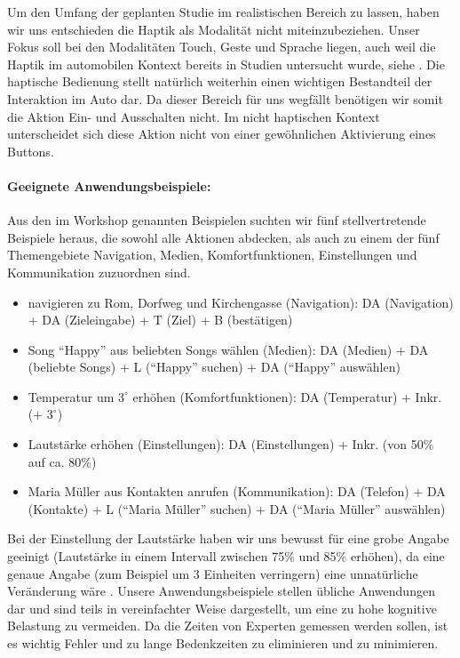 Um den Umfang der geplanten Studie im realistischen Bereich zu lassen, haben wir uns entschieden die Haptik als Modalität nicht miteinzubeziehen. 
Unser Fokus soll bei den Modalitäten Touch, Geste und Sprache liegen, auch weil die Haptik im automobilen Kontext bereits in Studien untersucht wurde, siehe \citep{Pettitt_2007, schneegass_2009, SchneegaB_2011}. 
Die haptische Bedienung stellt natürlich weiterhin einen wichtigen Bestandteil der Interaktion im Auto dar. Da dieser Bereich für uns wegfällt benötigen wir somit die Aktion Ein- und Ausschalten nicht. 
Im nicht haptischen Kontext unterscheidet sich diese Aktion nicht von einer gewöhnlichen Aktivierung eines Buttons.
\paragraph{Geeignete Anwendungsbeispiele:}
Aus den im Workshop genannten Beispielen suchten wir fünf stellvertretende Beispiele heraus, die sowohl alle Aktionen abdecken, als auch zu einem der fünf Themengebiete Navigation, Medien, Komfortfunktionen, Einstellungen und Kommunikation zuzuordnen sind. 
\begin{itemize}
\item navigieren zu Rom, Dorfweg und Kirchengasse (Navigation): DA (Navigation) + DA (Zieleingabe) + T (Ziel) + B (bestätigen)
\item Song "`Happy"' aus beliebten Songs wählen (Medien): DA (Medien) + DA (beliebte Songs) + L ("`Happy"' suchen) + DA ("`Happy"' auswählen)
\item Temperatur um $3^\circ$ erhöhen (Komfortfunktionen): DA (Temperatur) + Inkr. (+ $3^\circ$)
\item Lautstärke erhöhen (Einstellungen): DA (Einstellungen) + Inkr. (von 50\% auf ca. 80\%)
\item Maria Müller aus Kontakten anrufen (Kommunikation): DA (Telefon) + DA (Kontakte) + L ("`Maria Müller"' suchen) + DA ("`Maria Müller"' auswählen)
\end{itemize}
Bei der Einstellung der Lautstärke haben wir uns bewusst für eine grobe Angabe geeinigt (Lautstärke in einem Intervall zwischen 75\% und 85\% erhöhen), da eine genaue Angabe (zum Beispiel um 3 Einheiten verringern) eine unnatürliche Veränderung wäre \citep{stracke2014touch}. 
Unsere Anwendungsbeispiele stellen übliche Anwendungen dar und sind teils in vereinfachter Weise dargestellt, um eine zu hohe kognitive Belastung zu vermeiden. 
Da die Zeiten von Experten gemessen werden sollen, ist es wichtig Fehler und zu lange Bedenkzeiten zu eliminieren und zu minimieren.


